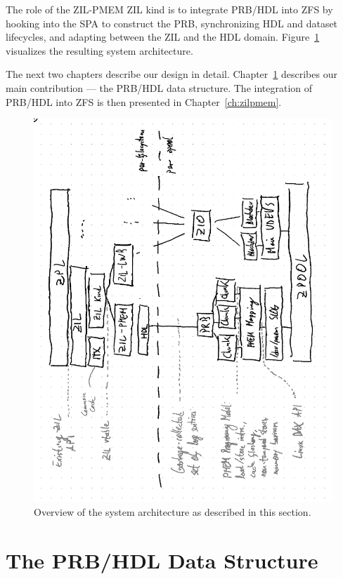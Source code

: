 \documentclass[12pt,a4paper,twoside]{book}
\begin{document}
The role of the ZIL-PMEM ZIL kind is to integrate PRB/HDL into ZFS by
hooking into the SPA to construct the PRB,
synchronizing HDL and dataset lifecycles, and
adapting between the ZIL and the HDL domain.
Figure~\ref{fig:zilpmem_architecture} visualizes the resulting system architecture.

The next two chapters describe our design in detail.
Chapter~\ref{ch:prbhdl} describes our main contribution --- the PRB/HDL data structure.
The integration of PRB/HDL into ZFS is then presented in Chapter~\ref{ch:zilpmem}.

\begin{figure}[H]
    \includegraphics{fig/zilpmem_architecture_overview}
    \caption{Overview of the system architecture as described in this section.}
    \label{fig:zilpmem_architecture}
\end{figure}

\chapter{The PRB/HDL Data Structure}\label{ch:prbhdl}
\end{document}
